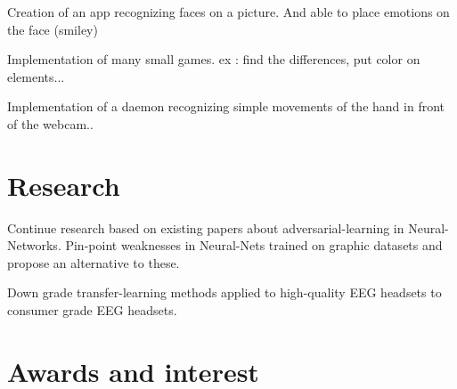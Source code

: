\documentclass[letterpaper]{deedy-resume} %
\begin{document}
\begin{minipage}[t]{0.66\textwidth}
\sectionspace %



\begin{tightitemize}
\item Creation of an app recognizing faces on a picture. And able to place emotions on the face (smiley)
\item Implementation of many small games. ex : find the differences, put color on elements...
\item Implementation of a daemon recognizing simple movements of the hand in front of the webcam..
\end{tightitemize}

\sectionspace %


\section{Research}


Continue research based on existing papers about adversarial-learning in Neural-Networks. Pin-point weaknesses in Neural-Nets trained on graphic datasets and propose an alternative to these.

\sectionspace %



Down grade transfer-learning methods applied to high-quality EEG headsets to consumer grade EEG headsets.

\sectionspace %


\section{Awards and interest} 


\end{minipage}
\end{document}
